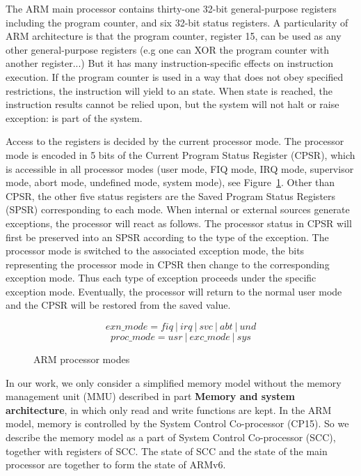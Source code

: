\sloppy
The ARM main processor contains thirty-one 32-bit general-purpose
registers including the program counter, and six 32-bit status
registers.  A particularity of ARM architecture is that the program
counter, register 15, can be used as any other general-purpose
registers (e.g one can XOR the program counter with another register...)
But it has many instruction-specific effects on instruction
execution.  If the program counter is used in a way that does not obey specified
restrictions, the instruction will yield to an \unpred state.  When \unpred
state is reached, the instruction results cannot be relied upon, but the system
will not halt or raise exception:  \unpred is part
of the system.

Access to the registers is decided by the current processor mode.  The
processor mode is encoded in 5 bits of the Current Program Status
Register (CPSR), which is accessible in all processor modes (user
mode, FIQ mode, IRQ mode, supervisor mode, abort mode, undefined mode,
system mode), see Figure~\ref{fig:armpm}.  Other than CPSR, the other
five status registers are the Saved Program Status Registers (SPSR)
corresponding to each mode.  When internal or external sources
generate exceptions, the processor will react as follows.  The
processor status in CPSR will first be preserved into an SPSR
according to the type of the exception.  The processor mode is switched
to the associated exception mode, the bits representing the processor
mode in CPSR then change to the corresponding exception mode.  Thus
each type of exception proceeds under the specific exception
mode. Eventually, the processor will return to the normal user mode
and the CPSR will be restored from the saved value.

\fussy

\begin{figure}[h]
\centering
$$exn\_mode=fiq~|~irq~|~svc~|~abt~|~und$$
$$proc\_mode=usr~|~exc\_mode~|~sys$$
\caption{ARM processor modes}
\label{fig:armpm}
\end{figure}

In our work, we only consider a simplified memory model without the
memory management unit (MMU) described in part {\bf Memory and system
  architecture}, in which only read and write functions are kept.  In
the ARM model, memory is controlled by the System Control Co-processor
(CP15). So we describe the memory model as a part of System Control
Co-processor (SCC), together with registers of SCC.  The state of SCC
and the state of the main processor are together to form the state of
ARMv6.

